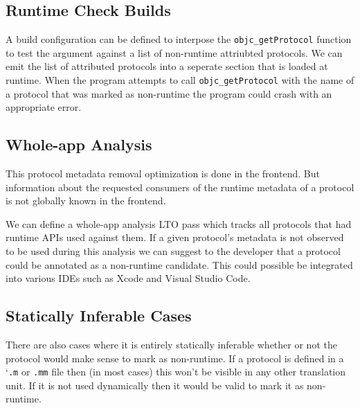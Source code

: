 \documentclass{article}
\begin{document}
\subsection{Runtime Check Builds}

A build configuration can be defined to interpose the \verb|objc_getProtocol|
function to test the argument against a list of non-runtime attriubted protocols.
We can emit the list of attributed protocols into a seperate section that is
loaded at runtime. When the program attempts to call \verb|objc_getProtocol|
with the name of a protocol that was marked as non-runtime the program could
crash with an appropriate error.

\subsection{Whole-app Analysis}

This protocol metadata removal optimization is done in the frontend. But
information about the requested consumers of the runtime metadata of a protocol
is not globally known in the frontend.

We can define a whole-app analysis LTO pass which tracks all protocols that had
runtime APIs used against them. If a given protocol's metadata is not observed
to be used during this analysis we can suggest to the developer that a protocol
could be annotated as a non-runtime candidate. This could possible be integrated
into various IDEs such as Xcode and Visual Studio Code.

\subsection{Statically Inferable Cases}

There are also cases where it is entirely statically inferable whether or not
the protocol would make sense to mark as non-runtime. If a protocol is defined
in a `\verb|.m| or \verb|.mm| file then (in most cases) this won't be visible
in any other translation unit. If it is not used dynamically then it would be
valid to mark it as non-runtime.
\end{document}
